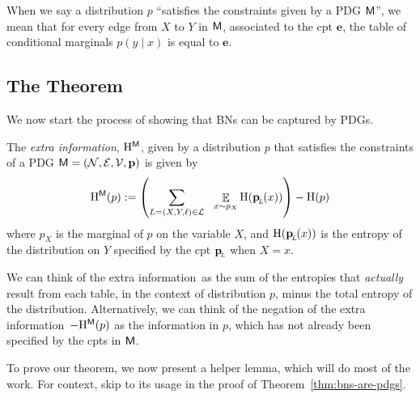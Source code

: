 \documentclass{article}
\newcommand{\bp}[1][L]{\mat{p}_{\!_{#1}\!}}
\newcommand{\V}{\mathcal V}
\newcommand{\N}{\mathcal N}
\newcommand{\Ed}{\mathcal E}
\newcommand{\sfM}{\mathsf M}
\def\mnvars[#1]{(\N#1, \Ed#1, \V#1, \mat p #1)}
\def\extrainfo{extra information}
\begin{document}
When we say a distribution $p$ ``satisfies the constraints given by a PDG $\sf M$'', we mean that for every edge from $X$ to $Y$ in $\sf M$, associated to the cpt $\mathbf e$, the table of conditional marginals $p(y \mid x)$ is equal to $\mathbf e$.

\subsection*{The Theorem}
We now start the process of showing that BNs can be captured by PDGs. 

\begin{defn}
	The \emph{\extrainfo}, $\H^{\sfM}$, given by a distribution $p$ that satisfies the constraints of a PDG $\sfM = \mnvars[]$ is given by
	\[ \H^{\sfM}(p) := \left(\sum_{L = (X,Y, \ell)\in \cal L} ~~\E_{x \sim p_X}  \H (\bp (x)) \right) - \H(p) \] 
	where $p_X$ is the marginal of $p$ on the variable $X$, and $\H(\bp(x))$ is the entropy of the distribution on $Y$ specified by the cpt $\bp$ when $X = x$. 
\end{defn}
We can think of the \extrainfo\ as the sum of the entropies that \emph{actually} result from each table, in the context of distribution $p$, minus the total entropy of the distribution.
Alternatively, we can think of the negation of the \extrainfo\, $-\H^\sfM(p)$ as the information in $p$, which has not already been specified by the cpts in $\sf M$.

To prove our theorem, we now present a helper lemma, which will do most of the work. For context, skip to its usage in the proof of Theorem~\ref{thm:bns-are-pdgs}.
\end{document}
